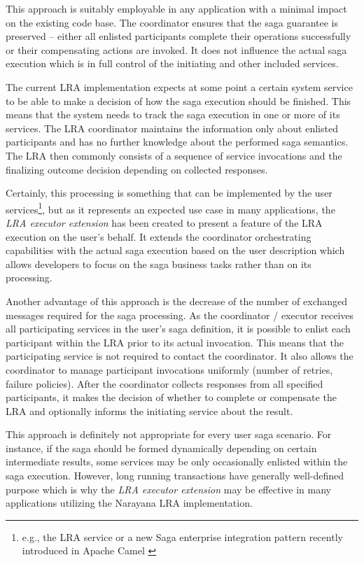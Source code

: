 \documentclass[oneside,
  digital, %
  table,   %
  lof,     %
  lot,     %
]{fithesis3}
\begin{document}
This approach is suitably employable in any application with a minimal impact on the existing code base. The coordinator ensures that the saga guarantee is preserved -- either all enlisted participants complete their operations successfully or their compensating actions are invoked. It does not influence the actual saga execution which is in full control of the initiating and other included services.

The current LRA implementation expects at some point a certain system service to be able to make a decision of how the saga execution should be finished. This means that the system needs to track the saga execution in one or more of its services. The LRA coordinator maintains the information only about enlisted participants and has no further knowledge about the performed saga semantics. The LRA then commonly consists of a sequence of service invocations and the finalizing outcome decision depending on collected responses.

Certainly, this processing is something that can be implemented by the user services\footnote{e.g., the LRA service or a new Saga enterprise integration pattern recently introduced in Apache Camel \cite{camel_saga}}, but as it represents an expected use case in many applications, the \textit{LRA executor extension} has been created to present a feature of the LRA execution on the user's behalf. It extends the coordinator orchestrating capabilities with the actual saga execution based on the user description which allows developers to focus on the saga business tasks rather than on its processing.

Another advantage of this approach is the decrease of the number of exchanged messages required for the saga processing. As the coordinator / executor receives all participating services in the user's saga definition, it is possible to enlist each participant within the LRA prior to its actual invocation. This means that the participating service is not required to contact the coordinator. It also allows the coordinator to manage participant invocations uniformly (number of retries, failure policies). After the coordinator collects responses from all specified participants, it makes the decision of whether to complete or compensate the LRA and optionally informs the initiating service about the result.

This approach is definitely not appropriate for every user saga scenario. For instance, if the saga should be formed dynamically depending on certain intermediate results, some services may be only occasionally enlisted within the saga execution. However, long running transactions have generally well-defined purpose which is why the \textit{LRA executor extension} may be effective in many applications utilizing the Narayana LRA implementation.
\end{document}
